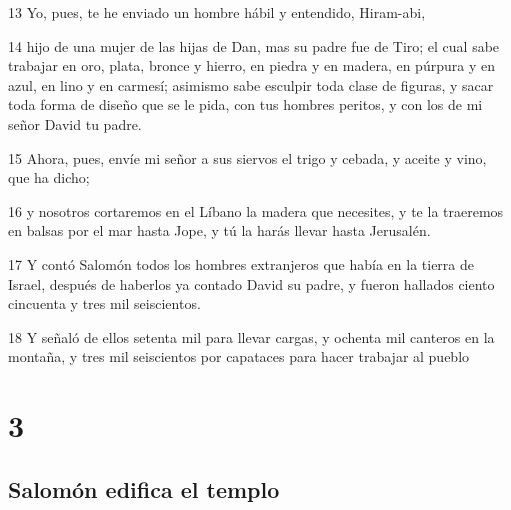\par 13 Yo, pues, te he enviado un hombre hábil y entendido, Hiram-abi,
\par 14 hijo de una mujer de las hijas de Dan, mas su padre fue de Tiro; el cual sabe trabajar en oro, plata, bronce y hierro, en piedra y en madera, en púrpura y en azul, en lino y en carmesí; asimismo sabe esculpir toda clase de figuras, y sacar toda forma de diseño que se le pida, con tus hombres peritos, y con los de mi señor David tu padre.
\par 15 Ahora, pues, envíe mi señor a sus siervos el trigo y cebada, y aceite y vino, que ha dicho;
\par 16 y nosotros cortaremos en el Líbano la madera que necesites, y te la traeremos en balsas por el mar hasta Jope, y tú la harás llevar hasta Jerusalén.
\par 17 Y contó Salomón todos los hombres extranjeros que había en la tierra de Israel, después de haberlos ya contado David su padre, y fueron hallados ciento cincuenta y tres mil seiscientos.
\par 18 Y señaló de ellos setenta mil para llevar cargas, y ochenta mil canteros en la montaña, y tres mil seiscientos por capataces para hacer trabajar al pueblo

\chapter{3}

\section*{Salomón edifica el templo }

